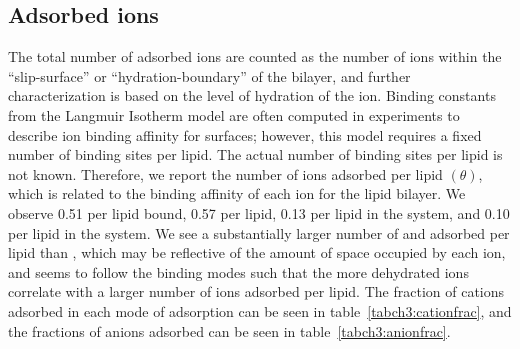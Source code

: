 \subsection{Adsorbed ions}
\label{sec:boundions}
The total number of adsorbed ions are counted as the number of ions within the ``slip-surface'' or ``hydration-boundary'' of the bilayer, and
further characterization is based on the level of hydration of the ion.
Binding constants from the Langmuir Isotherm model are often computed in experiments to describe ion binding affinity for
surfaces; however, this model requires a fixed number of binding sites per lipid. The actual number of binding sites
per lipid is not known. Therefore, we report the number of ions adsorbed per lipid $(\theta)$, which 
{is related to} 
the binding affinity of each ion for the lipid bilayer.
We observe 0.51 \na{} per lipid bound, 0.57 \li{} per lipid, 0.13 \mg{} per lipid in the \mgmbnbfix{} system, and 0.10 \mg{} per lipid
in the \mgmicro{} system. We see a substantially larger number of \na{} and \li{} adsorbed per lipid than
\mg{}, which may be reflective of the amount of space occupied by each ion, and seems to follow the
binding modes such that the more dehydrated ions correlate with a larger number of ions adsorbed per lipid.
The fraction of cations adsorbed in each mode of adsorption can be seen in table~\ref{tabch3:cationfrac}, and the fractions
of \cl{} anions adsorbed can be seen in table~\ref{tabch3:anionfrac}.
